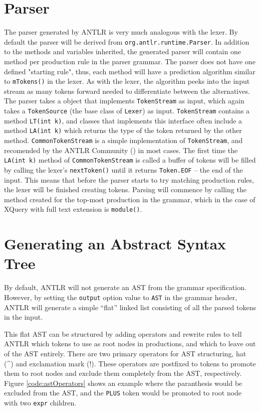 \section{Parser}
\label{sect:antlr:parser}
The parser generated by ANTLR is very much analogous with the lexer. By default the parser will be derived from \verb!org.antlr.runtime.Parser!. In addition to the methods and variables inherited, the generated parser will contain one method per production rule in the parser grammar. The parser does not have one defined "starting rule", thus, each method will have a prediction algorithm similar to \verb!mTokens()! in the lexer. As with the lexer, the algorithm peeks into the input stream as many tokens forward needed to differentiate between the alternatives. The parser takes a object that implements \verb!TokenStream! as input, which again takes a \verb!TokenSource! (the base class of \verb!Lexer!) as input. \verb!TokenStream! contains a method \verb!LT(int k)!, and classes that implements this interface often include a method \verb!LA(int k)! which returns the type of the token returned by the other method. \verb!CommonTokenStream! is a simple implementation of \verb!TokenStream!, and recomended by the ANTLR Community (\cite{antlrorg}) in most cases. The first time the \verb!LA(int k)! method of \verb!CommonTokenStream! is called a buffer of tokens will be filled by calling the lexer's \verb!nextToken()! until it returns \verb!Token.EOF! -- the end of the input. This means that before the parser starts to try matching production rules, the lexer will be finished creating tokens. Parsing will commence by calling the method created for the top-most production in the grammar, which in the case of XQuery with full text extension is \verb!module()!.

\section{Generating an Abstract Syntax Tree}
\label{sect:antlr:ast}
By default, ANTLR will not generate an AST from the grammar specification.
However, by setting the \verb!output! option value to \verb!AST! in the grammar
header, ANTLR will generate a simple ``flat'' linked list consisting of all the
parsed tokens in the input. 

This flat AST can be structured by adding operators and rewrite rules to tell
ANTLR which tokens to use as root nodes in productions, and which to leave out
of the AST entirely. There are two primary operators for AST structuring, hat
(\^{}) and exclamation mark (!). These operators are postfixed to tokens to
promote them to root nodes and exclude them completely from the AST,
respectively. Figure \ref{code:astOperators} shows an example where the
paranthesis would be excluded from the AST, and the \verb!PLUS! token
would be promoted to root node with two \verb!expr! children.


